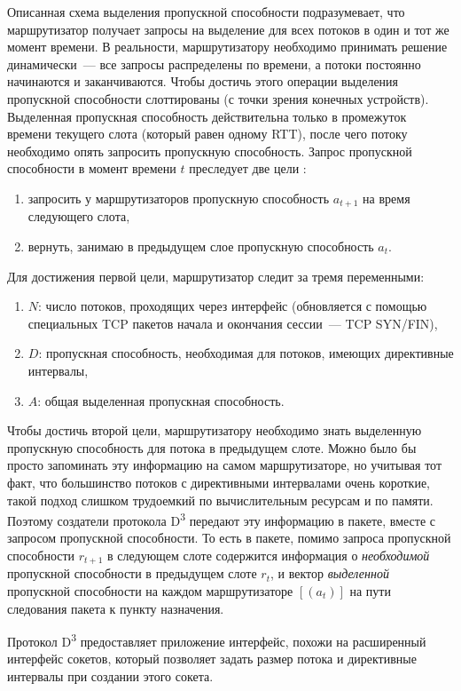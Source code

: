 \documentclass[14pt, a4paper,oneside]{extarticle}
\begin{document}
Описанная схема выделения пропускной способности подразумевает, что маршрутизатор получает запросы на выделение для всех потоков в один и тот же момент времени. В реальности, маршрутизатору необходимо принимать решение динамически~--- все запросы распределены по времени, а потоки постоянно начинаются и заканчиваются. Чтобы достичь этого операции выделения пропускной способности слоттированы (с точки зрения конечных устройств). Выделенная пропускная способность действительна только в промежуток времени текущего слота (который равен одному RTT), после чего потоку необходимо опять запросить пропускную способность. Запрос пропускной способности в момент времени $t$ преследует две цели :
\begin{enumerate}
\item запросить у маршрутизаторов пропускную способность $a_{t+1}$ на время следующего слота,
\item вернуть, занимаю в предыдущем слое пропускную способность $a_t$.
\end{enumerate}

Для достижения первой цели, маршрутизатор следит за тремя переменными:
\begin{enumerate}
\item $N$: число потоков, проходящих через интерфейс (обновляется с помощью специальных TCP пакетов начала и окончания сессии~--- TCP SYN/FIN),
\item $D$: пропускная способность, необходимая для потоков, имеющих директивные интервалы,
\item $A$: общая выделенная пропускная способность.
\end{enumerate}

Чтобы достичь второй цели, маршрутизатору необходимо знать выделенную пропускную способность для потока в предыдущем слоте. Можно было бы просто запоминать эту информацию на самом маршрутизаторе, но учитывая тот факт, что большинство потоков с директивными интервалами очень короткие, такой подход слишком трудоемкий по вычислительным ресурсам и по памяти. Поэтому создатели протокола D\textsuperscript{3} передают эту информацию в пакете, вместе с запросом пропускной способности. То есть в пакете, помимо запроса пропускной способности $r_{t+1}$ в следующем слоте содержится информация о \emph{необходимой} пропускной способности в предыдущем слоте $r_t$, и вектор \emph{выделенной} пропускной способности на каждом маршрутизаторе $[(a_t)]$ на пути следования пакета к пункту назначения.

Протокол D\textsuperscript{3} предоставляет приложение интерфейс, похожи на расширенный интерфейс сокетов, который позволяет задать размер потока и директивные интервалы при создании этого сокета.
\end{document}
